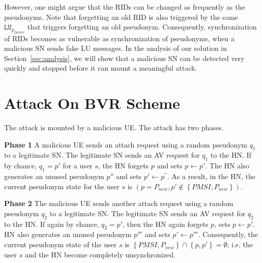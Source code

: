 \documentclass{llncs} %
\begin{document}
However, one might argue that the RIDs can be changed as frequently as the pseudonyms. Note that forgetting an old RID is also triggered by the same $\texttt{LU}_{p_{future}}$ that triggers forgetting an old pseudonym. Consequently, synchronization of RIDs becomes as vulnerable as synchronization of pseudonyms, when a malicious SN sends fake LU messages. In the analysis of our solution in Section~\ref{sec:analysis}, we will show that a malicious SN can be detected very quickly and stopped before it can mount a meaningful attack.

\section{Attack On BVR Scheme} \label{sec:attack}
The attack is mounted by a malicious UE. The attack has two phases. 


\textbf{Phase 1 } A malicious UE sends an attach request using a random pseudonym $q_1$ to a legitimate SN. The legitimate SN sends an AV request for $q_1$ to the HN. If by chance, $q_1 = p'$ for a user $s$, the HN forgets $p$ and sets $p \leftarrow p'$. The HN also generates an unused pseudonym $p''$ and sets $p' \leftarrow p^{''}$. As a result, in the HN, the current  pseudonym state for the user $s$ is $\left(p = P_{new},p' \notin \left\lbrace PMSI,P_{new} \right\rbrace \right)$. %

\textbf{Phase 2 }The malicious UE sends another attach request using a random pseudonym $q_2$ to a legitimate SN. The legitimate SN sends an AV request for $q_2$ to the HN. If again by chance, $q_2 = p'$, then the HN again forgets $p$, sets $p \leftarrow p'$. HN also generates an unused pseudonym $p'''$ and sets $p' \leftarrow p'''$. Consequently, the current pseudonym state of the user $s$ is $\left\lbrace PMSI,P_{new} \right\rbrace \cap \left\lbrace p,p' \right\rbrace = \emptyset$; i.e. the user $s$ and the HN become completely unsynchronized. %

\end{document}

